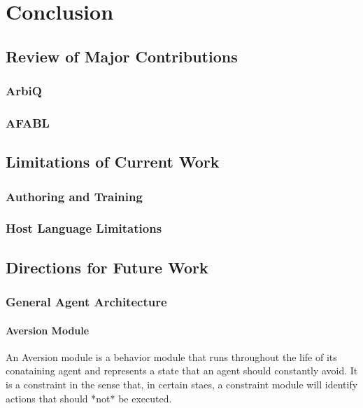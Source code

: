 \chapter{Conclusion}\label{ch:conclusion}


\section{Review of Major Contributions}

\subsection{ArbiQ}

\subsection{AFABL}

\section{Limitations of Current Work}

\subsection{Authoring and Training}

\subsection{Host Language Limitations}

\section{Directions for Future Work}

\subsection{General Agent Architecture}

\subsubsection{Aversion Module}

An Aversion module is a behavior module that runs throughout the life
of its conataining agent and represents a state that an agent should
constantly avoid.  It is a constraint in the sense that, in certain
staes, a constraint module will identify actions that should *not* be
executed.


